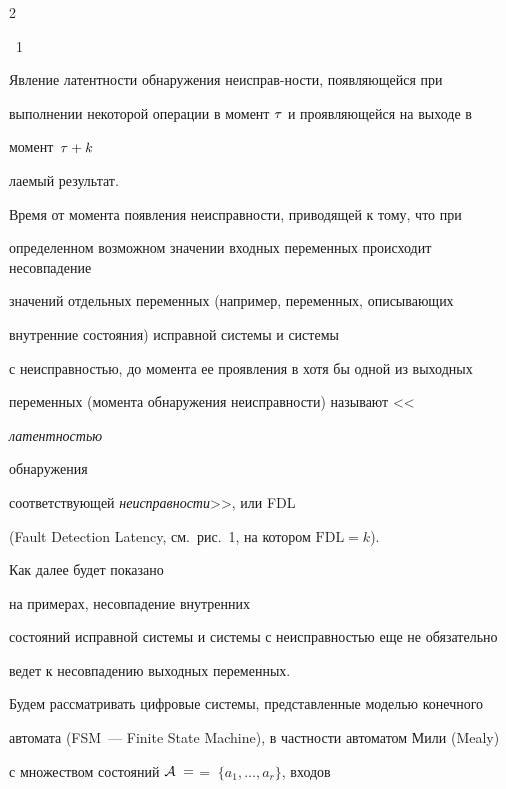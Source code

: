 \begin{multicols}{2}
{{\figurename~1}\ \ \small{Явление латентности обнаружения неисправ-\linebreak ности, появляющейся при


выполнении некоторой операции в момент $\tau$ и проявляющейся на выходе в


момент~$\tau + k$}}







\medskip




\addtocounter{figure}{1}











\noindent


лаемый результат.


Время от момента появления неисправности, приводящей к тому, что при


определенном возможном значении входных переменных происходит несовпадение


значений отдельных переменных (например, переменных, опи\-сы\-ва\-ющих


внутренние состояния) исправной сис\-те\-мы и сис\-те\-мы


с неисправностью, до момента ее проявления в хотя бы одной из выходных


переменных (момента обнаружения неисправности) называют <<{\it латентностью


обнаружения} соответствующей {\it не\-ис\-прав\-ности}>>, или FDL


(Fault Detection Latency, см.\ рис.~1, на котором $\mathrm{FDL} = k$).


Как далее будет показано


на примерах, несовпадение внутренних


состояний исправной сис\-те\-мы и сис\-те\-мы с неисправностью еще не обязательно


ведет к несовпадению выходных переменных.








 Будем рассматривать цифровые системы, представленные моделью конечного


автомата (FSM~--- Finite State Machine), в частности автоматом Мили (Mealy)


с множеством состояний ${\cal A}\;=$\linebreak $=\;\{a_1,\ldots,a_r\}$, входов



\end{multicols}
